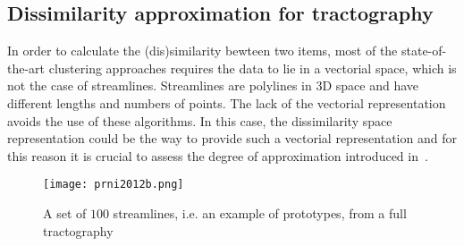 \subsection{Dissimilarity approximation for tractography}
\label{subsec:dissimilarity}
In order to calculate the (dis)similarity bewteen two items, most of the state-of-the-art clustering approaches requires the data to lie in a vectorial space, which is not the case of streamlines. Streamlines are polylines in $3$D space and have different lengths and numbers of points. The lack of the vectorial representation avoids the use of these algorithms. In this case,
the dissimilarity space representation could be the way to provide such a vectorial representation and for this reason it is crucial to assess the degree of approximation introduced in~\cite{olivetti2012approximation}. 
\begin{figure}
  \centering
  \texttt{[image: prni2012b.png]}
  \caption{A set of $100$ streamlines, i.e. an example of prototypes, from a full tractography}
  \label{fig:streamlines}
\end{figure}

